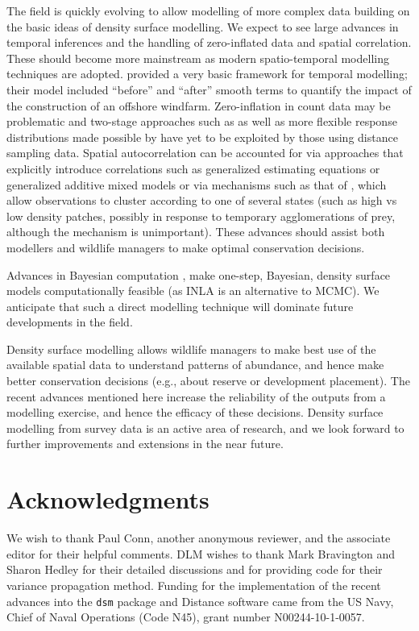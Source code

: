 \documentclass[a4paper,12pt]{article}
\begin{document}
The field is quickly evolving to allow modelling of more complex data building on the basic ideas of density surface modelling. We expect to see large advances in temporal inferences and the handling of zero-inflated data and spatial correlation. These should become more mainstream as modern spatio-temporal modelling techniques are adopted. \cite{Petersen:2011vy} provided a very basic framework for temporal modelling; their model included ``before'' and ``after'' smooth terms to quantify the impact of the construction of an offshore windfarm. Zero-inflation in count data may be problematic and two-stage approaches such as \cite{Barry:2002bm} as well as more flexible response distributions made possible by \cite{Rigby:2005wb} have yet to be exploited by those using distance sampling data. Spatial autocorrelation can be accounted for via approaches that explicitly introduce correlations such as generalized estimating equations \cite[GEEs;][]{Hardin:2003uf} or generalized additive mixed models or via mechanisms such as that of \cite{Skaug:2006gs}, which allow observations to cluster according to one of several states (such as high vs low density patches, possibly in response to temporary agglomerations of prey, although the mechanism is unimportant). These advances should assist both modellers and wildlife managers to make optimal conservation decisions. 

Advances in Bayesian computation \cite[INLA;][]{Rue:2009tw}, make one-step, Bayesian, density surface models computationally feasible (as INLA is an alternative to MCMC). We anticipate that such a direct modelling technique will dominate future developments in the field.

Density surface modelling allows wildlife managers to make best use of the available spatial data to understand patterns of abundance, and hence make better conservation decisions (e.g., about reserve or development placement). The recent advances mentioned here increase the reliability of the outputs from a modelling exercise, and hence the efficacy of these decisions.  Density surface modelling from survey data is an active area of research, and we look forward to further improvements and extensions in the near future.

\section*{Acknowledgments}

We wish to thank Paul Conn, another anonymous reviewer, and the associate editor for their helpful comments. DLM wishes to thank Mark Bravington and Sharon Hedley for their detailed discussions and for providing code for their variance propagation method. Funding for the implementation of the recent advances into the \texttt{dsm} package and Distance software came from the US Navy, Chief of Naval Operations (Code N45), grant number \mbox{N00244-10-1-0057}.
\end{document}
